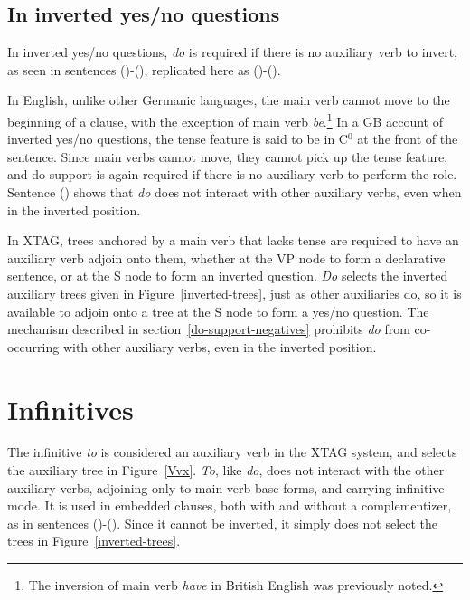 
\subsection{In inverted yes/no questions}

In inverted yes/no questions, {\it do} is required if there is no auxiliary
verb to invert, as seen in sentences ()-(), replicated here
as ()-().


In English, unlike other Germanic languages, the main verb cannot move to the
beginning of a clause, with the exception of main verb {\it be}.\footnote{The
inversion of main verb {\it have} in British English was previously noted.}  In
a GB account of inverted yes/no questions, the tense feature is said to be in
C$^{0}$ at the front of the sentence.  Since main verbs cannot move, they
cannot pick up the tense feature, and do-support is again required if there is
no auxiliary verb to perform the role.  Sentence () shows that {\it do}
does not interact with other auxiliary verbs, even when in the inverted
position.

In XTAG, trees anchored by a main verb that lacks tense are required to have an
auxiliary verb adjoin onto them, whether at the VP node to form a declarative
sentence, or at the S node to form an inverted question.  {\it Do} selects the
inverted auxiliary trees given in Figure~\ref{inverted-trees}, just as other
auxiliaries do, so it is available to adjoin onto a tree at the S node to form
a yes/no question.  The mechanism described in
section~\ref{do-support-negatives} prohibits {\it do} from co-occurring with
other auxiliary verbs, even in the inverted position.


\section{Infinitives}

The infinitive {\it to} is considered an auxiliary verb in the XTAG system, and
selects the auxiliary tree in Figure~\ref{Vvx}.  {\it To}, like {\it do}, does
not interact with the other auxiliary verbs, adjoining only to main verb base
forms, and carrying infinitive mode.  It is used in embedded clauses, both with
and without a complementizer, as in sentences ()-().  Since it
cannot be inverted, it simply does not select the trees in
Figure~\ref{inverted-trees}.


